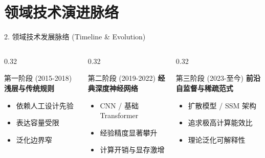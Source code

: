 \documentclass[aspectratio=169,10pt,UTF8]{ctexbeamer}
\begin{document}
\section{领域技术演进脉络}
\begin{frame}{2. 领域技术发展脉络 (Timeline \& Evolution)}
  \begin{columns}[T]
    \begin{column}{0.32\textwidth}
      \begin{alertblock}{第一阶段 (2015-2018)}
        \textbf{浅层与传统规则}
        \begin{itemize}
          \item 依赖人工设计先验
          \item 表达容量受限
          \item 泛化边界窄
        \end{itemize}
      \end{alertblock}
    \end{column}
    \begin{column}{0.32\textwidth}
      \begin{block}{第二阶段 (2019-2022)}
        \textbf{经典深度神经网络}
        \begin{itemize}
          \item CNN / 基础 Transformer
          \item 经验精度显著攀升
          \item 计算开销与显存激增
        \end{itemize}
      \end{block}
    \end{column}
    \begin{column}{0.32\textwidth}
      \begin{exampleblock}{第三阶段 (2023-至今)}
        \textbf{前沿自监督与稀疏范式}
        \begin{itemize}
          \item 扩散模型 / SSM 架构
          \item 追求极高计算能效比
          \item 理论泛化可解释性
        \end{itemize}
      \end{exampleblock}
    \end{column}
  \end{columns}
\end{frame}

\end{document}
